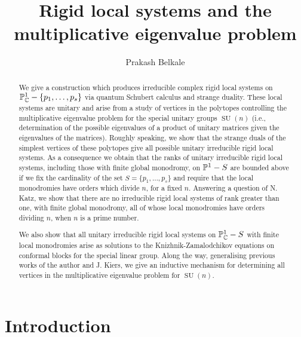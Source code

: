 \documentclass[11pt]{amsart}
\newcommand\op{\operatorname}
\numberwithin{theorem}{subsection}
\begin{document}
\title[Vertices of eigenpolytopes and rigid local systems]{Rigid local systems and  the multiplicative eigenvalue problem}
\author{Prakash Belkale}
\maketitle

\begin{abstract}
We give a construction which produces irreducible complex rigid local systems on $\Bbb{P}_{\Bbb{C}}^1-\{p_1,\dots,p_s\}$ via quantum Schubert calculus and strange duality. These local systems are unitary and arise from a study of vertices in the polytopes controlling  the multiplicative eigenvalue problem for the special unitary groups $\op{SU}(n)$ (i.e., determination of the possible eigenvalues of a product of unitary matrices given the eigenvalues of the matrices). Roughly speaking, we show that the strange duals of the simplest vertices  of these polytopes give all possible unitary irreducible rigid local systems. As a consequence we obtain  that the ranks of unitary irreducible rigid local systems, including those with finite global monodromy, on $\Bbb{P}^1-S$ are bounded above if we fix the cardinality of the set $S=\{p_1,\dots,p_s\}$ and require that the local monodromies have orders which divide $n$, for a fixed $n$.  Answering a question of N. Katz, we show that there are no irreducible rigid local systems  of rank greater than one, with finite global monodromy, all of whose local monodromies have orders dividing $n$, when $n$ is a prime number.


We also show that all unitary irreducible rigid local systems on $\Bbb{P}^1_{\Bbb{C}} -S$ with finite local monodromies arise as solutions to the Knizhnik-Zamalodchikov  equations on conformal blocks for the special linear group. Along the way, generalising previous works of the author and J. Kiers, we give an inductive mechanism for determining all vertices in the multiplicative eigenvalue problem for $\op{SU}(n)$.



\end{abstract}

\setcounter{tocdepth}{1}
\tableofcontents




\section{Introduction}
\end{document}
